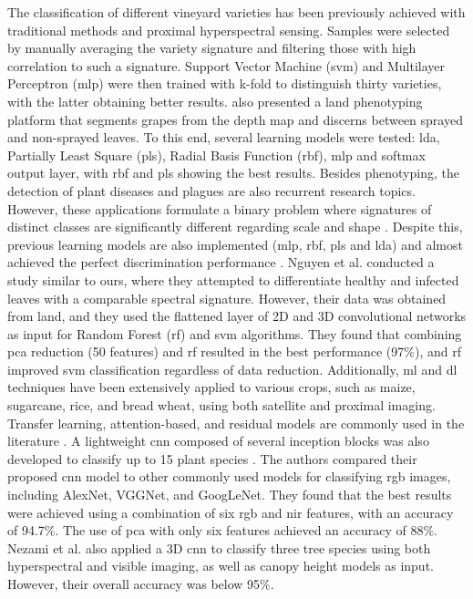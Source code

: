 The classification of different vineyard varieties has been previously achieved with traditional methods and proximal hyperspectral sensing. Samples were selected by manually averaging the variety signature and filtering those with high correlation to such a signature. Support Vector Machine (\acrshort{svm}) and Multilayer Perceptron (\acrshort{mlp}) were then trained with k-fold to distinguish thirty varieties, with the latter obtaining better results. \cite{kicherer_phenoliner_2017} also presented a land phenotyping platform that segments grapes from the depth map and discerns between sprayed and non-sprayed leaves. To this end, several learning models were tested: \acrshort{lda}, Partially Least Square (\acrshort{pls}), Radial Basis Function (\acrshort{rbf}), \acrshort{mlp} and softmax output layer, with \acrshort{rbf} and \acrshort{pls} showing the best results. Besides phenotyping, the detection of plant diseases \cite{nguyen_early_2021, bendel_detection_2020, bendel_evaluating_2020} and plagues \cite{mendes_vineinspector_2022, teixeira_systematic_2023} are also recurrent research topics. However, these applications formulate a binary problem where signatures of distinct classes are significantly different regarding scale \cite{bendel_detection_2020} and shape \cite{bendel_detection_2020}. Despite this, previous learning models are also implemented (\acrshort{mlp}, \acrshort{rbf}, \acrshort{pls} and \acrshort{lda}) and almost achieved the perfect discrimination performance \cite{bendel_evaluating_2020}. Nguyen et al. \cite{nguyen_early_2021} conducted a study similar to ours, where they attempted to differentiate healthy and infected leaves with a comparable spectral signature. However, their data was obtained from land, and they used the flattened layer of 2D and 3D convolutional networks as input for Random Forest (\acrshort{rf}) and \acrshort{svm} algorithms. They found that combining \acrshort{pca} reduction (50 features) and \acrshort{rf} resulted in the best performance (97\%), and \acrshort{rf} improved \acrshort{svm} classification regardless of data reduction. Additionally, \acrshort{ml} and \acrshort{dl} techniques have been extensively applied to various crops, such as maize, sugarcane, rice, and bread wheat, using both satellite and proximal imaging. Transfer learning, attention-based, and residual models are commonly used in the literature \cite{zhang_classification_2022}. A lightweight \acrshort{cnn} composed of several inception blocks was also developed to classify up to 15 plant species \cite{liu_plant_2022}. The authors compared their proposed \acrshort{cnn} model to other commonly used models for classifying \acrshort{rgb} images, including AlexNet, VGGNet, and GoogLeNet. They found that the best results were achieved using a combination of six \acrshort{rgb} and \acrshort{nir} features, with an accuracy of 94.7\%. The use of \acrshort{pca} with only six features achieved an accuracy of 88\%. Nezami et al. \cite{nezami_tree_2020} also applied a 3D \acrshort{cnn} to classify three tree species using both hyperspectral and visible imaging, as well as canopy height models as input. However, their overall accuracy was below 95\%.


